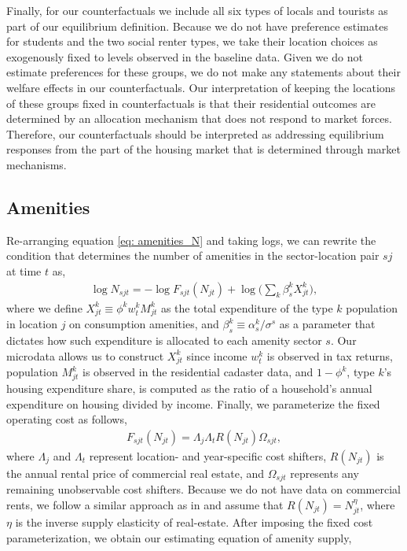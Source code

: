 \documentclass[11pt]{article}
\begin{document}
Finally, for our counterfactuals we include all six types of locals and tourists as part of our equilibrium definition. Because we do not have preference estimates for students and the two social renter types, we take their location choices as exogenously fixed to levels observed in the baseline data. Given we do not estimate preferences for these groups, we do not make any statements about their welfare effects in our counterfactuals. Our interpretation of keeping the locations of these groups fixed in counterfactuals is that their residential outcomes are determined by an allocation mechanism that does not respond to market forces. Therefore, our counterfactuals should be interpreted as addressing equilibrium responses from the part of the housing market that is determined through market mechanisms.

\subsection{Amenities}\label{sec: amenity_supply estimation}
Re-arranging equation \eqref{eq: amenities_N} and taking logs, we can rewrite the condition that determines the number of amenities in the sector-location pair $sj$ at time $t$ as,
\begin{align}
\log N_{sjt} = -  \log F_{sjt}(N_{jt})+\log \Big(\sum_k \beta_s^k  X_{jt}^k\Big),
\end{align}
where we define $X_{jt}^k \equiv \phi^k w^k_t M_{jt}^k$ as the total expenditure of the type $k$ population in location $j$ on consumption amenities, and $\beta_s^k \equiv \alpha_{s}^k/\sigma^s$ as a parameter that dictates how such expenditure is allocated to each amenity sector $s$. Our microdata allows us to construct $X_{jt}^k$ since income $w^k_t$ is observed in tax returns, population $M_{jt}^k$ is observed in the residential cadaster data, and $1-\phi^k$, type $k$'s housing expenditure share, is computed as the ratio of a household's annual expenditure on housing divided by income. Finally, we parameterize the fixed operating cost as follows,
\begin{align*}
    F_{sjt}(N_{jt}) = \Lambda_j \Lambda_t R(N_{jt})\Omega_{sjt},
\end{align*}
where $\Lambda_j$ and $\Lambda_t$ represent  location- and year-specific cost shifters, $R(N_{jt})$ is the annual rental price of commercial real estate, and $\Omega_{sjt}$ represents any remaining unobservable cost shifters. Because we do not have data on commercial rents, we follow a similar approach as in \cite{couture2021income} and assume that $R(N_{jt}) = N_{jt}^{\eta}$, where $\eta$ is the inverse supply elasticity of real-estate. After imposing the fixed cost parameterization, we obtain our estimating equation of amenity supply,
\end{document}

